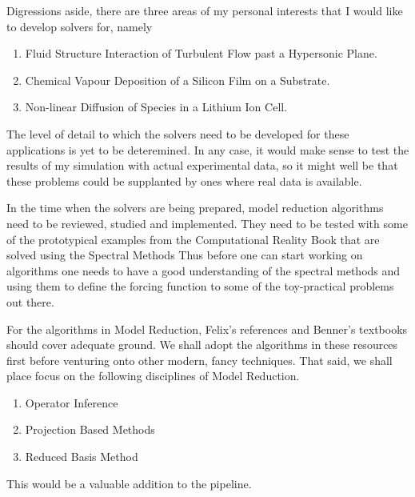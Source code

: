 \documentclass{article}
\begin{document}
Digressions aside, there are three areas of my personal interests that I would like to develop solvers for, namely
\begin{enumerate}
    \item Fluid Structure Interaction of Turbulent Flow past a Hypersonic Plane.
    \item Chemical Vapour Deposition of a Silicon Film on a Substrate.
    \item Non-linear Diffusion of Species in a Lithium Ion Cell.
\end{enumerate}

The level of detail to which the solvers need to be developed for these applications is yet to be deteremined.
In any case, it would make sense to test the results of my simulation with actual experimental data, so it might well be that these problems could be supplanted by ones where real data is available.

In the time when the solvers are being prepared, model reduction algorithms need to be reviewed, studied and implemented.
They need to be tested with some of the prototypical examples from the Computational Reality Book that are solved using the Spectral Methods
Thus before one can start working on algorithms one needs to have a good understanding of the spectral methods and using them to define the forcing function to some of the toy-practical problems out there.

For the algorithms in Model Reduction, Felix's references and Benner's textbooks should cover adequate ground. We shall adopt the algorithms in these resources first before venturing onto other modern, fancy techniques.
That said, we shall place focus on the following disciplines of Model Reduction.
\begin{enumerate}
    \item Operator Inference
    \item Projection Based Methods
    \item Reduced Basis Method
\end{enumerate}

This would be a valuable addition to the pipeline.
\end{document}
